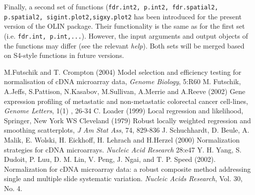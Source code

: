 \documentclass[a4paper,11pt]{article}
\begin{document}
Finally, a second set of functions  (\texttt{fdr.int2, p.int2, fdr.spatial2, p.spatial2, sigint.plot2,sigxy.plot2} has been introduced for the present version of the OLIN package. Their functionality is the same as for the first set (i.e. \texttt{fdr.int, p.int,...}). However, the input arguments  and output objects of the functions  may differ (see the  relevant \textit{help}). Both sets will be merged based on S4-style functions in future versions.



\begin{thebibliography}{99}
 M.Futschik and T. Crompton (2004) Model selection and efficiency testing for normalisation of cDNA microarray data, \emph{Genome Biology}, 5:R60  
 M. Futschik, A.Jeffs, S.Pattison, N.Kasabov, M.Sullivan, A.Merrie and A.Reeve (2002) Gene expression profiling of metastatic and non-metastatic colorectal cancer cell-lines,  \emph{Genome Letters}, 1(1) , 26-34
 C. Loader (1999) Local regression and likelihood, Springer, New York
 WS Cleveland (1979) Robust locally weighted regression and smoothing scatterplots,
\emph{J Am Stat Ass}, 74, 829-836
 J. Schuchhardt, D. Beule, A. Malik, E. Wolski, H. Eickhoff, H. Lehrach and H.Herzel (2000)
Normalization strategies for cDNA microarrays. \emph{Nucleic Acid Research} 28:e47
 Y. H. Yang, S. Dudoit, P. Luu, D. M. Lin, V. Peng, J. Ngai, and T.
     P. Speed (2002). Normalization for cDNA microarray data: a robust
     composite method addressing single and multiple slide systematic
     variation. \emph{Nucleic Acids Research}, Vol. 30, No. 4.
 


\end{thebibliography}
\end{document}
